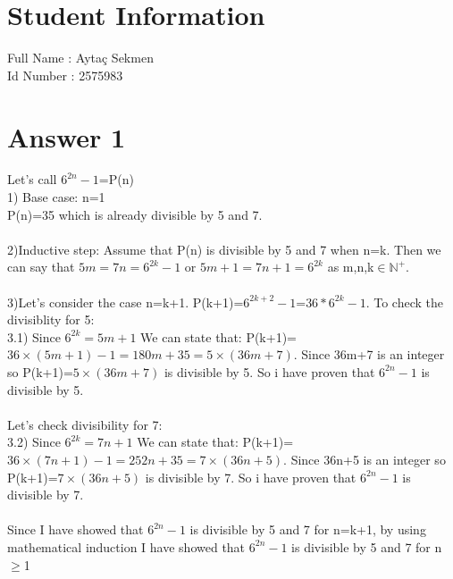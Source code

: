 \documentclass[12pt]{article}
\begin{document}
\section*{Student Information }
Full Name :  Aytaç Sekmen \\
Id Number :  2575983 \\

\section*{Answer 1}
Let's call $6^{2n}-1$=P(n)\\
1) Base case: n=1 \\
P(n)=35 which is already divisible by 5 and 7.\\
\\
2)Inductive step: Assume that P(n) is divisible by 5 and 7 when n=k. Then we can say that $5m=7n=6^{2k}-1$ or $5m+1=7n+1=6^{2k}$ as m,n,k$\in \mathbb{N^+}$.\\
\\
3)Let's consider the case n=k+1. P(k+1)=$6^{2k+2}-1$=$36*6^{2k}-1$. To check the divisiblity for 5:\\
3.1) Since $6^{2k}=5m+1$ We can state that: P(k+1)=$36 \times(5m+1)-1=180m+35=5\times(36m+7)$. Since 36m+7 is an integer so P(k+1)=$5\times(36m+7)$ is divisible by 5. So i have proven that  $6^{2n}-1$ is divisible by 5.\\
\\
Let's check divisibility for 7:\\
3.2) Since $6^{2k}=7n+1$ We can state that: P(k+1)=$36 \times(7n+1)-1=252n+35=7\times(36n+5)$. Since 36n+5 is an integer so P(k+1)=$7\times(36n+5)$ is divisible by 7. So i have proven that  $6^{2n}-1$ is divisible by 7.\\\\
Since I have showed that  $6^{2n}-1$ is divisible by 5 and 7 for n=k+1, by using mathematical induction I have showed that  $6^{2n}-1$ is divisible by 5 and 7 for n $\geq$1
\end{document}
